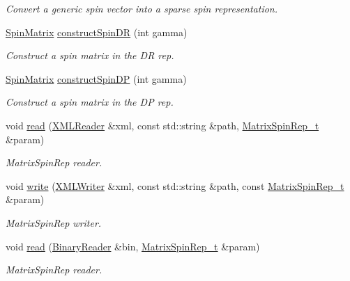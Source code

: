 \begin{DoxyCompactItemize}
\begin{DoxyCompactList}\small\item\em Convert a generic spin vector into a sparse spin representation. \end{DoxyCompactList}\item 
\mbox{\hyperlink{group__defs_gad066768e154e358a7f3c0708c774be29}{Spin\+Matrix}} \mbox{\hyperlink{namespaceHadron_add425eaa856f87203aaf3bd1e3eb086d}{construct\+Spin\+DR}} (int gamma)
\begin{DoxyCompactList}\small\item\em Construct a spin matrix in the DR rep. \end{DoxyCompactList}\item 
\mbox{\hyperlink{group__defs_gad066768e154e358a7f3c0708c774be29}{Spin\+Matrix}} \mbox{\hyperlink{namespaceHadron_af2328410f9a0a7191a4d319284425fed}{construct\+Spin\+DP}} (int gamma)
\begin{DoxyCompactList}\small\item\em Construct a spin matrix in the DP rep. \end{DoxyCompactList}\item 
void \mbox{\hyperlink{namespaceHadron_ad46ef728c9d609cbf63217c66bdf0285}{read}} (\mbox{\hyperlink{classADATXML_1_1XMLReader}{X\+M\+L\+Reader}} \&xml, const std\+::string \&path, \mbox{\hyperlink{structHadron_1_1MatrixSpinRep__t}{Matrix\+Spin\+Rep\+\_\+t}} \&param)
\begin{DoxyCompactList}\small\item\em Matrix\+Spin\+Rep reader. \end{DoxyCompactList}\item 
void \mbox{\hyperlink{namespaceHadron_a433908e65befd36f268196398b8469c7}{write}} (\mbox{\hyperlink{classADATXML_1_1XMLWriter}{X\+M\+L\+Writer}} \&xml, const std\+::string \&path, const \mbox{\hyperlink{structHadron_1_1MatrixSpinRep__t}{Matrix\+Spin\+Rep\+\_\+t}} \&param)
\begin{DoxyCompactList}\small\item\em Matrix\+Spin\+Rep writer. \end{DoxyCompactList}\item 
void \mbox{\hyperlink{namespaceHadron_af8ce56081c184ce7dd924a192bff08a6}{read}} (\mbox{\hyperlink{classADATIO_1_1BinaryReader}{Binary\+Reader}} \&bin, \mbox{\hyperlink{structHadron_1_1MatrixSpinRep__t}{Matrix\+Spin\+Rep\+\_\+t}} \&param)
\begin{DoxyCompactList}\small\item\em Matrix\+Spin\+Rep reader. \end{DoxyCompactList}\item 

\end{DoxyCompactItemize}
